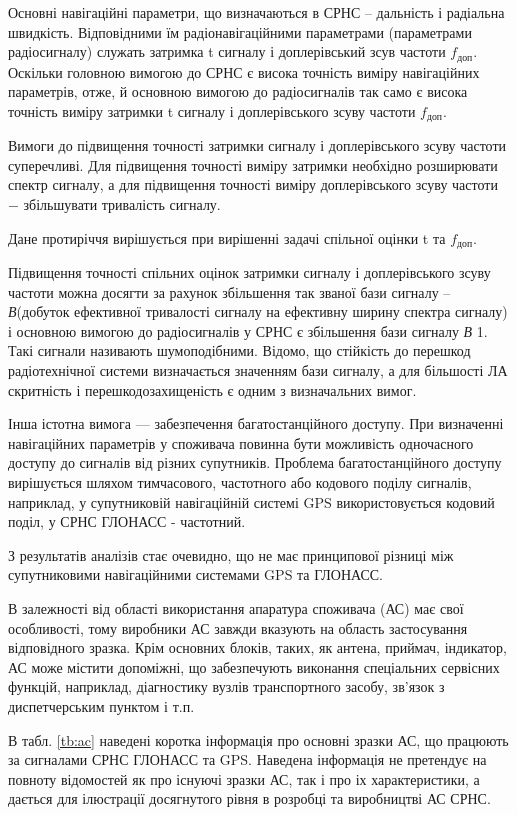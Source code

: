 Основні навігаційні параметри, що визначаються в СРНС -- дальність і радіальна швидкість. Відповідними 
їм радіонавігаційними параметрами (параметрами радіосигналу) служать затримка t сигналу і доплерівський 
зсув частоти $f_\text{доп}$. Оскільки головною вимогою до СРНС є висока точність виміру 
навігаційних параметрів, отже, й основною вимогою до радіосигналів так само є висока точність 
виміру затримки t сигналу і доплерівського зсуву частоти $f_\text{доп}$.

Вимоги до підвищення точності затримки сигналу і доплерівського зсуву частоти суперечливі. 
Для підвищення точності виміру затримки необхідно розширювати спектр сигналу, а для підвищення 
точності виміру  доплерівського зсуву частоти $-$  збільшувати тривалість сигналу.

Дане протиріччя вирішується при вирішенні задачі спільної оцінки t та  $f_\text{доп}$.

Підвищення точності спільних оцінок затримки сигналу і доплерівського зсуву частоти можна 
досягти за рахунок збільшення так званої  бази сигналу -- \textit{В}(добуток ефективної 
тривалості сигналу на ефективну ширину спектра сигналу) і основною вимогою до радіосигналів у 
СРНС є збільшення бази сигналу \textit{В}  1. Такі сигнали називають шумоподібними. 
Відомо, що стійкість до перешкод радіотехнічної системи визначається значенням бази сигналу, 
а для більшості ЛА скритність і перешкодозахищеність є одним з визначальних вимог. 

Інша істотна вимога --- забезпечення багатостанційного доступу. При визначенні навігаційних 
параметрів у споживача повинна бути можливість одночасного доступу до сигналів від різних 
супутників. Проблема багатостанційного доступу вирішується шляхом тимчасового, частотного 
або кодового поділу сигналів, наприклад, у супутниковій навігаційній системі GPS використовується 
кодовий поділ, у СРНС ГЛОНАСС - частотний.

З результатів аналізів стає очевидно, що не має принципової різниці між супутниковими 
навігаційними системами GPS та ГЛОНАСС.

В залежності від області використання апаратура споживача (АС) має свої особливості, 
тому виробники АС завжди вказують на область застосування відповідного зразка. Крім 
основних блоків, таких, як антена, приймач, індикатор, АС може містити допоміжні, що 
забезпечують виконання спеціальних сервісних функцій, наприклад, діагностику вузлів 
транспортного засобу, зв'язок з диспетчерським пунктом і т.п.

В табл. \ref{tb:ac} наведені коротка інформація про основні зразки АС, що працюють за сигналами 
СРНС ГЛОНАСС та GPS. Наведена інформація не претендує на повноту відомостей як про існуючі 
зразки АС, так і про іх характеристики, а дається для ілюстрації досягнутого рівня 
в розробці та виробництві АС СРНС.

